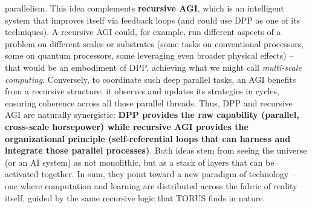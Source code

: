\documentclass[
]{article}
\begin{document}
\begin{itemize}
  parallelism\hspace{0pt}. This idea complements \textbf{recursive AGI},
  which is an intelligent system that improves itself via feedback loops
  (and could use DPP as one of its techniques). A recursive AGI could,
  for example, run different aspects of a problem on different scales or
  substrates (some tasks on conventional processors, some on quantum
  processors, some leveraging even broader physical effects) -- that
  would be an embodiment of DPP, achieving what we might call
  \emph{multi-scale computing}. Conversely, to coordinate such deep
  parallel tasks, an AGI benefits from a recursive structure: it
  observes and updates its strategies in cycles, ensuring coherence
  across all those parallel threads. Thus, DPP and recursive AGI are
  naturally synergistic: \textbf{DPP provides the raw capability
  (parallel, cross-scale horsepower) while recursive AGI provides the
  organizational principle (self-referential loops that can harness and
  integrate those parallel processes)}. Both ideas stem from seeing the
  universe (or an AI system) as not monolithic, but as a stack of layers
  that can be activated together. In sum, they point toward a new
  paradigm of technology -- one where computation and learning are
  distributed across the fabric of reality itself, guided by the same
  recursive logic that TORUS finds in nature.
\end{itemize}
\end{document}
